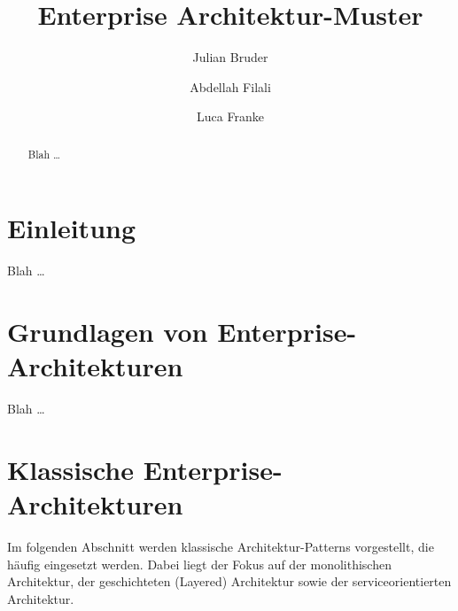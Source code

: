 \documentclass[acmtog]{acmart}
\begin{document}
\title{Enterprise Architektur-Muster}

\author{Julian Bruder}
\author{Abdellah Filali}
\authornotemark[1]
\author{Luca Franke}
\authornotemark[1]
\renewcommand{\shortauthors}{Bruder, Filali, Franke}

\begin{abstract}
Blah \ldots
\end{abstract}

\maketitle

\section{Einleitung}
Blah \ldots

\section{Grundlagen von Enterprise-Architekturen}
Blah \ldots

\section{Klassische Enterprise-Architekturen}
Im folgenden Abschnitt werden klassische Architektur-Patterns vorgestellt, 
die häufig eingesetzt werden. Dabei liegt der Fokus auf der monolithischen 
Architektur, der geschichteten (Layered) Architektur sowie der serviceorientierten
Architektur.\\
\end{document}

